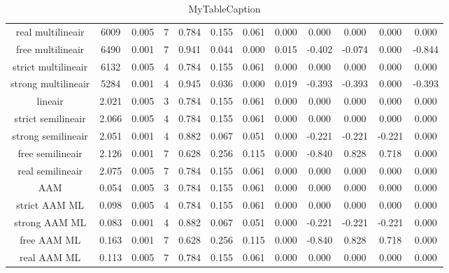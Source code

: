 \documentclass[12pt]{report}
\begin{document}
\begin{table}
\centering
\begin{tabular}{|c|c|c|c|c|c|c|c|c|c|c|c|}

\hline
 &  &  &  &  &  &  &  &  &  &  &  \\
\hline
real multilineair  & 6009 & 0.005 & 7 & 0.784 & 0.155 & 0.061 & 0.000 & 0.000 & 0.000 & 0.000 & 0.000 \\
\hline
free multilineair  & 6490 & 0.001 & 7 & 0.941 & 0.044 & 0.000 & 0.015 & -0.402 & -0.074 & 0.000 & -0.844 \\
\hline
strict multilineair  & 6132 & 0.005 & 4 & 0.784 & 0.155 & 0.061 & 0.000 & 0.000 & 0.000 & 0.000 & 0.000 \\
\hline
strong multilineair  & 5284 & 0.001 & 4 & 0.945 & 0.036 & 0.000 & 0.019 & -0.393 & -0.393 & 0.000 & -0.393 \\
\hline
lineair  & 2.021 & 0.005 & 3 & 0.784 & 0.155 & 0.061 & 0.000 & 0.000 & 0.000 & 0.000 & 0.000 \\
\hline
strict semilineair  & 2.066 & 0.005 & 4 & 0.784 & 0.155 & 0.061 & 0.000 & 0.000 & 0.000 & 0.000 & 0.000 \\
\hline
strong semilineair  & 2.051 & 0.001 & 4 & 0.882 & 0.067 & 0.051 & 0.000 & -0.221 & -0.221 & -0.221 & 0.000 \\
\hline
free semilineair  & 2.126 & 0.001 & 7 & 0.628 & 0.256 & 0.115 & 0.000 & -0.840 & 0.828 & 0.718 & 0.000 \\
\hline
real semilineair  & 2.075 & 0.005 & 7 & 0.784 & 0.155 & 0.061 & 0.000 & 0.000 & 0.000 & 0.000 & 0.000 \\
\hline
AAM  & 0.054 & 0.005 & 3 & 0.784 & 0.155 & 0.061 & 0.000 & 0.000 & 0.000 & 0.000 & 0.000 \\
\hline
strict AAM ML  & 0.098 & 0.005 & 4 & 0.784 & 0.155 & 0.061 & 0.000 & 0.000 & 0.000 & 0.000 & 0.000 \\
\hline
strong AAM ML  & 0.083 & 0.001 & 4 & 0.882 & 0.067 & 0.051 & 0.000 & -0.221 & -0.221 & -0.221 & 0.000 \\
\hline
free AAM ML  & 0.163 & 0.001 & 7 & 0.628 & 0.256 & 0.115 & 0.000 & -0.840 & 0.828 & 0.718 & 0.000 \\
\hline
real AAM ML  & 0.113 & 0.005 & 7 & 0.784 & 0.155 & 0.061 & 0.000 & 0.000 & 0.000 & 0.000 & 0.000 \\
\hline
\end{tabular}
\caption{MyTableCaption}
\label{table:road}
\end{table}
\end{document}
